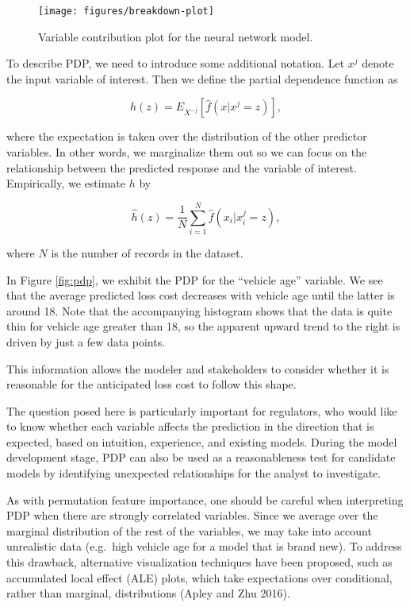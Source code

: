 \documentclass[preprint, 3p, twocolumn, letterpaper, 10pt]{elsarticle} %
\begin{document}
\begin{figure*}[h]

{\centering \texttt{[image: figures/breakdown-plot]} 

}

\caption{Variable contribution plot for the neural network model.}\label{fig:breakdown}
\end{figure*}

To describe PDP, we need to introduce some additional notation. Let \(x^j\) denote
the input variable of interest. Then we define the partial dependence function as

\begin{equation}
h(z) = E_{X^{-j}}[\widehat{f}(x|x^j = z)],
\end{equation}

where the expectation is taken over the distribution of the other predictor
variables. In other words, we marginalize them out so we can focus on the
relationship between the predicted response and the variable of interest.
Empirically, we estimate \(h\) by

\begin{equation}
\widehat{h}(z) = \frac{1}{N}\sum_{i = 1}^{N}\widehat{f}(x_i|x_i^{j} = z),
\end{equation}

where \(N\) is the number of records in the dataset.

In Figure \ref{fig:pdp}, we exhibit the PDP for the ``vehicle age'' variable.
We see that the average predicted loss cost decreases with vehicle age until
the latter is around 18. Note that the accompanying histogram shows that the
data is quite thin for vehicle age greater than 18, so the apparent upward
trend to the right is driven by just a few data points.

This information allows the modeler and stakeholders to consider whether it
is reasonable for the anticipated loss cost to follow this shape.

The question posed here is particularly important for regulators, who would
like to know whether each variable affects the prediction in the direction that
is expected, based on intuition, experience, and existing models. During the
model development stage, PDP can also be used as a reasonableness test for
candidate models by identifying unexpected relationships for the analyst to
investigate.

As with permutation feature importance, one should be careful when interpreting
PDP when there are strongly correlated variables. Since we average over the
marginal distribution of the rest of the variables, we may take into account
unrealistic data (e.g.~high vehicle age for a model that is brand new). To
address this drawback, alternative visualization techniques have been proposed,
such as accumulated local effect (ALE) plots, which take expectations over
conditional, rather than marginal, distributions (Apley and Zhu 2016).
\end{document}
